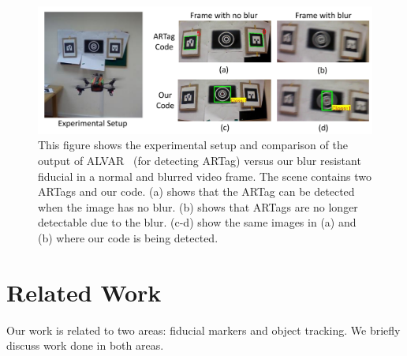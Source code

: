 \documentclass[10pt,twocolumn,letterpaper]{article}
\begin{document}
\begin{figure}
\includegraphics[width=\linewidth]{teaser.pdf}
\caption{This figure shows the experimental setup and comparison of
the output of ALVAR~\cite{alvar} (for detecting ARTag) versus our blur resistant
fiducial in a normal and blurred video frame. The scene contains two ARTags and our code.
(a) shows that the ARTag can be detected when the image has no blur.
(b) shows that ARTags are no longer detectable due to the blur.
(c-d) show the same images in (a) and (b) where our code is being detected.}
\label{fig:teaser}
\end{figure}

\section{Related Work}

Our work is related to two areas: fiducial markers and object tracking. We
briefly discuss work done in both areas.
\end{document}
